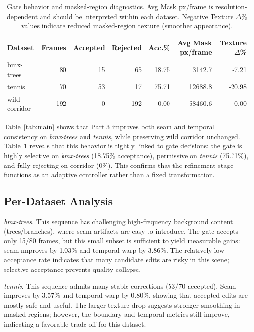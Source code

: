 \documentclass[10pt,twocolumn,letterpaper]{article}
\begin{document}
\begin{table}[t]
\centering
\scriptsize
\caption{Gate behavior and masked-region diagnostics. Avg Mask px/frame is resolution-dependent and should be interpreted within each dataset. Negative Texture $\Delta$\% values indicate reduced masked-region texture (smoother appearance).}
\label{tab:gate}
\begin{tabular}{lrrrrrr}
\toprule
Dataset & Frames & Accepted & Rejected & Acc.\% & Avg Mask px/frame & Texture $\Delta$\% \\
\midrule
bmx-trees & 80 & 15 & 65 & 18.75 & 3142.7 & -7.21 \\
tennis & 70 & 53 & 17 & 75.71 & 12688.8 & -20.98 \\
wild corridor & 192 & 0 & 192 & 0.00 & 58460.6 & 0.00 \\
\bottomrule
\end{tabular}
\end{table}

Table~\ref{tab:main} shows that Part 3 improves both seam and temporal consistency on \textit{bmx-trees} and \textit{tennis}, while preserving wild corridor unchanged. Table~\ref{tab:gate} reveals that this behavior is tightly linked to gate decisions: the gate is highly selective on \textit{bmx-trees} (18.75\% acceptance), permissive on \textit{tennis} (75.71\%), and fully rejecting on corridor (0\%). This confirms that the refinement stage functions as an adaptive controller rather than a fixed transformation.

\subsection{Per-Dataset Analysis}
\textit{bmx-trees}. This sequence has challenging high-frequency background content (trees/branches), where seam artifacts are easy to introduce. The gate accepts only 15/80 frames, but this small subset is sufficient to yield measurable gains: seam improves by 1.03\% and temporal warp by 3.86\%. The relatively low acceptance rate indicates that many candidate edits are risky in this scene; selective acceptance prevents quality collapse.

\textit{tennis}. This sequence admits many stable corrections (53/70 accepted). Seam improves by 3.57\% and temporal warp by 0.80\%, showing that accepted edits are mostly safe and useful. The larger texture drop suggests stronger smoothing in masked regions; however, the boundary and temporal metrics still improve, indicating a favorable trade-off for this dataset.
\end{document}
